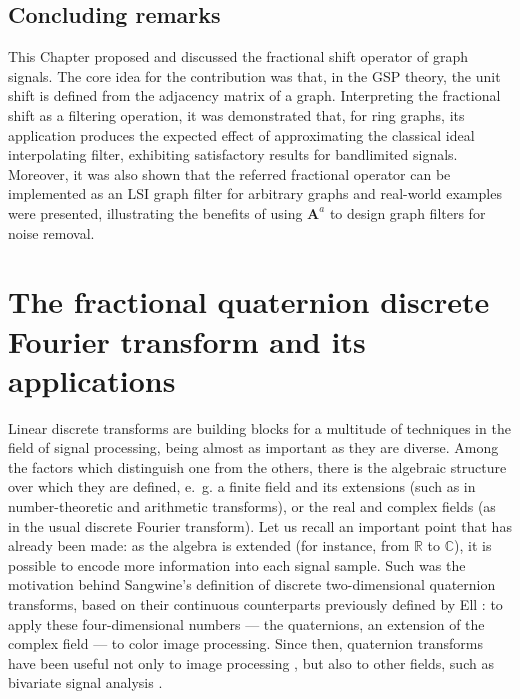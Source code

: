 \section{Concluding remarks}\label{sec:conc}
This Chapter proposed and discussed the fractional shift operator of graph signals. The core idea for the contribution was that, in the GSP theory, the unit shift is defined from the adjacency matrix of a graph. Interpreting the fractional shift as a filtering operation, it was demonstrated that, for ring graphs, its application produces the expected effect of approximating the classical ideal interpolating filter, exhibiting satisfactory results for bandlimited signals. Moreover, it was also shown that the referred fractional operator can be implemented as an LSI graph filter for arbitrary graphs and real-world examples were presented, illustrating the benefits of using $\mathbf{A}^a$ to design graph filters for noise removal.


\chapter{The fractional quaternion discrete Fourier transform and its applications}
\label{ch:FrQDFT}

Linear discrete transforms are building blocks for a multitude of techniques in the field of signal processing, being almost as important as they are diverse. Among the factors which distinguish one from the others, there is the algebraic structure over which they are defined, e.~g. a finite field and its extensions (such as in number-theoretic \cite{blahut2010fast,pedrouzo2017number,chandra2014exact,lima2013} and arithmetic \cite{knockaert1994generalized, rajapaksha2014vlsi} transforms), or the real and complex fields (as in the usual discrete Fourier transform). Let us recall an important point that has already been made: as the algebra is extended (for instance, from $ \mathbb{R} $ to $ \mathbb{C} $), it is possible to encode more information into each signal sample. Such was the motivation behind Sangwine's definition \cite{sangwine1996fourier} of discrete two-dimensional quaternion transforms, based on their continuous counterparts previously defined by Ell \cite{ell1993quaternion}: to apply these four-dimensional numbers --- the quaternions, an extension of the complex field --- to color image processing. Since then, quaternion transforms have been useful not only to image processing \cite{ell2007hypercomplex,chen2018quaternion,li2013quaternion,evans2000hypercomplex,silva2018}, but also to other fields, such as bivariate signal analysis \cite{flamant2017spectral,flamant2017time,flamant2018complete}.

